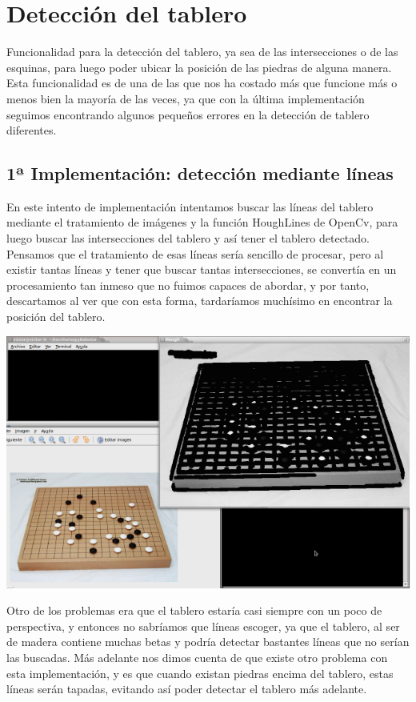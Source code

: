 \documentclass[12pt,a4papert,woside,openright,titlepage,final]{book}
\begin{document}



\section{Detección del tablero} 

Funcionalidad para la detección del tablero, ya sea de las intersecciones o de
las esquinas, para luego poder ubicar la posición de las piedras de alguna
manera. Esta funcionalidad es de una de las que nos ha costado más que funcione
más o menos bien la mayoría de las veces, ya que con la última implementación
seguimos encontrando algunos pequeños errores en la detección de tablero
diferentes. 

\subsection{1ª Implementación: detección mediante líneas}

En este intento de implementación intentamos buscar las líneas del tablero 
mediante el tratamiento de imágenes y la función HoughLines de OpenCv, para 
luego buscar las intersecciones del tablero y así tener el tablero detectado. 
Pensamos que el tratamiento de esas líneas sería sencillo de procesar, pero al
existir tantas líneas y tener que buscar tantas intersecciones, se convertía en
un procesamiento tan inmeso que no fuimos capaces de abordar, y por tanto,
descartamos al ver que con esta forma, tardaríamos muchísimo en encontrar la
posición del tablero.

\includegraphics[scale=0.6]{detect-lineas.png}

Otro de los problemas era que el tablero estaría casi siempre con un poco de
perspectiva, y entonces no sabríamos que líneas escoger, ya que el tablero, al
ser de madera contiene muchas betas y podría detectar bastantes líneas que no
serían las buscadas. 
Más adelante nos dimos cuenta de que existe otro problema con esta
implementación, y es que cuando existan piedras encima del tablero, estas líneas
serán tapadas, evitando así poder detectar el tablero más adelante.
 
\end{document}
